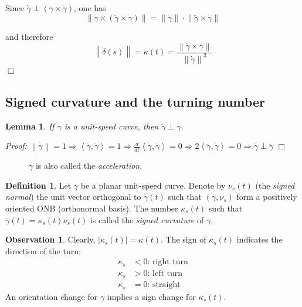 \documentclass[a4paper,11pt,notitlepage,fullpage]{paper}
\newcommand{\dy}{\dot\gamma}
\newcommand{\ddy}{\ddot\gamma}
\theoremstyle{plain}
\newtheorem{lem}[thm]{Lemma}
\theoremstyle{definition}
\newtheorem{defn}[thm]{Definition} %
\newtheorem{obsv}[thm]{Observation}
\begin{document}
Since $\dot\gamma \perp (\ddot\gamma \times \dot\gamma)$, one has 
\begin{equation*}
\left\|\dot\gamma \times (\ddot\gamma \times \dot\gamma)\right\| = \left\|\dot\gamma\right\| \cdot \left\|\ddot\gamma \times \dot\gamma\right\|
\end{equation*}

and therefore 
\begin{equation*}
\left\|\ddot\delta(s)\right\| = \kappa(t) = \frac{\left\|\dy \times \ddy\right\|}{\left\|\dy\right\|^3}
\end{equation*}
\hfill $\Box$


\subsection{Signed curvature and the turning number}

\begin{lem}
If $\gamma$ is a unit-speed curve, then $\ddot\gamma \perp \dot\gamma$.
\end{lem}

\emph{Proof:} $\left\|\dot\gamma\right\| = 1 \Rightarrow \left\langle\dot\gamma, \dot\gamma\right\rangle = 1 \Rightarrow \frac{d}{dt} \left\langle\dot\gamma, \dot\gamma\right\rangle = 0 \Rightarrow 2 \left\langle\ddot\gamma, \dot\gamma\right\rangle = 0 \Rightarrow \dot\gamma \perp \ddot\gamma$ \hfill $\Box$


\begin{figure}[H]
\centering
\def\svgwidth{0.3\textwidth}

\caption{$\ddy$ is also called the \emph{acceleration}.}
\label{fig:velocity-and-acceleration}
\end{figure}


\begin{defn}
Let $\gamma$ be a planar unit-speed curve. Denote by $\nu_s(t)$ (the \emph{signed normal}) the unit vector orthogonal to $\dot\gamma(t)$ such that $(\dot\gamma, \nu_s)$ form a positively oriented ONB (orthonormal basis). The number $\kappa_s(t)$ such that $\ddot\gamma(t) = \kappa_s(t) \nu_s(t)$ is called the \emph{signed curvature} of $\gamma$.
\end{defn}

\begin{obsv}
Clearly, $|\kappa_s(t)| = \kappa(t)$. The sign of $\kappa_s(t)$ indicates the direction of the turn:
\begin{align*}
\kappa_s &< 0\text{: right turn} \\
\kappa_s &> 0\text{: left turn} \\
\kappa_s &= 0\text{: straight}
\end{align*}
An orientation change for $\gamma$ implies a sign change for $\kappa_s(t)$.
\end{obsv}
\end{document}
